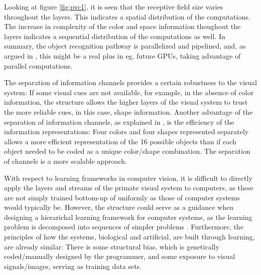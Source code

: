 Looking at figure \ref{fig:pvc1}, it is seen that the receptive field size varies throughout the layers.
This indicates a spatial distribution of the computations.
The increase in complexity of the color and space information thoughout the layers
indicates a sequential distribution of the computations as well. In summary, the object recognition pathway
is parallelized and pipelined, and, as argued in \cite{kruger2013deep},
this might be a real plus in eg. future GPUs, taking advantage of parallel computations.

The separation of information channels provides a certain robustness to the visual system:
If some visual cues are not available, for example, in the absence of color information,
the structure allows the higher layers of the visual system to trust the more reliable cues,
in this case, shape information.
Another advantage of the separation of information channels, as explained in \cite{kruger2013deep},
is the efficiency of the information representations:
Four colors and four shapes represented separately allows a more efficient
representation of the 16 possible objects than if each object needed to be coded as a unique color/shape combination.
The separation of channels is a more scalable approach.

With respect to learning frameworks in computer vision,
it is difficult to directly apply the layers and streams of the primate visual system
to computers, as these are not simply trained bottom-up of uniformly as those of computer systems would typically be.
However, the structure could serve as a guidance when designing a hierarichal learning framework
for computer systems, as the learning problem is decomposed into sequences of simpler problems \citep{kruger2013deep}.
Furthermore, the principles of how the systems, biological and artificial,
are built through learning, are already similar:
There is some structural bias, which is genetically coded/manually designed by the programmer,
and some exposure to visual signals/images, serving as training data sets.
